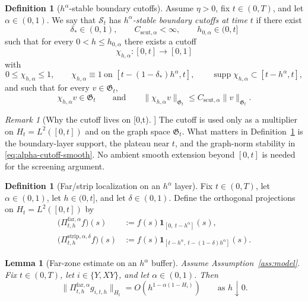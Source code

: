 \documentclass[11pt,a4paper]{amsart}
\theoremstyle{plain}
\newtheorem{lemma}[theorem]{Lemma}
\theoremstyle{definition}
\newtheorem{definition}[theorem]{Definition}
\theoremstyle{remark}
\newtheorem{remark}[theorem]{Remark}
\newcommand{\one}{\mathbf 1}
\begin{document}
\begin{definition}[\(h^\alpha\)-stable boundary cutoffs]
\label{def:alpha-cutoff-smooth}
Assume \(\eta>0\), fix \(t\in(0,T)\), and let \(\alpha\in(0,1)\). We say that \(\mathcal S_t\)
has \emph{\(h^\alpha\)-stable boundary cutoffs at time \(t\)} if there exist
\[
\delta_*\in(0,1),\qquad C_{\mathrm{scut},\alpha}<\infty,\qquad h_{0,\alpha}\in(0,t]
\]
such that for every \(0<h\le h_{0,\alpha}\) there exists a cutoff
\[
\chi_{h,\alpha}:[0,t]\to[0,1]
\]
with
\[
0\le \chi_{h,\alpha}\le 1,\qquad
\chi_{h,\alpha}\equiv1\ \text{on }[t-(1-\delta_*)h^\alpha,t],\qquad
\operatorname{supp}\chi_{h,\alpha}\subset[t-h^\alpha,t],
\]
and such that for every \(v\in\mathfrak G_t\),
\begin{equation}\label{eq:alpha-cutoff-smooth}
\chi_{h,\alpha}v\in\mathfrak G_t
\qquad\text{and}\qquad
\|\chi_{h,\alpha}v\|_{\mathfrak G_t}
\le
C_{\mathrm{scut},\alpha}\|v\|_{\mathfrak G_t}.
\end{equation}
\end{definition}

\begin{remark}[Why the cutoff lives on [0,t]]
The cutoff is used only as a multiplier on \(H_t=L^2([0,t])\) and on the graph space
\(\mathfrak G_t\). What matters in Definition~\ref{def:alpha-cutoff-smooth} is the boundary-layer
support, the plateau near \(t\), and the graph-norm stability in
\eqref{eq:alpha-cutoff-smooth}. No ambient smooth extension beyond \([0,t]\) is needed for the
screening argument.
\end{remark}

\begin{definition}[Far/strip localization on an \(h^\alpha\) layer]
\label{def:alpha-layer-projections}
Fix \(t\in(0,T)\), let \(\alpha\in(0,1)\), let \(h\in(0,t]\), and let \(\delta\in(0,1)\). Define
the orthogonal projections on \(H_t=L^2([0,t])\) by
\begin{align}
\bigl(\Pi_{t,h}^{\mathrm{far},\alpha}f\bigr)(s)
&:=f(s)\one_{[0,\ t-h^\alpha]}(s), \label{eq:Pi-far-alpha}\\
\bigl(\Pi_{t,h}^{\mathrm{strip},\alpha,\delta}f\bigr)(s)
&:=f(s)\one_{[t-h^\alpha,\ t-(1-\delta)h^\alpha]}(s).
\label{eq:Pi-strip-alpha}
\end{align}
\end{definition}

\begin{lemma}[Far-zone estimate on an \(h^\alpha\) buffer]
\label{lem:far-kernel-alpha}
Assume Assumption~\ref{ass:model}. Fix \(t\in(0,T)\), let \(i\in\{Y,XY\}\), and let
\(\alpha\in(0,1)\). Then
\begin{equation}\label{eq:far-kernel-alpha}
\|\Pi_{t,h}^{\mathrm{far},\alpha}g_{i,t,h}\|_{H_t}
=
O\!\left(h^{1-\alpha(1-H_i)}\right)
\qquad\text{as }h\downarrow0.
\end{equation}
\end{lemma}
\end{document}
